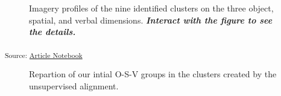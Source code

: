 \documentclass[
  authoryear]{elsarticle}
\begin{document}
\label{cell-fig-plot-osv-clusters}
\begin{figure}[H]


\caption{\label{fig-plot-osv-clusters}Imagery profiles of the nine
identified clusters on the three object, spatial, and verbal dimensions.
\textbf{\emph{Interact with the figure to see the details.}}}

\end{figure}%

\textsubscript{Source:
\href{https://m-delem.github.io/2499-similarity-manuscript/index.qmd.html}{Article
Notebook}}

\label{cell-fig-clusters-distribution}
\begin{figure}[H]


\caption{\label{fig-clusters-distribution}Repartion of our intial O-S-V
groups in the clusters created by the unsupervised alignment.}

\end{figure}%
\end{document}
